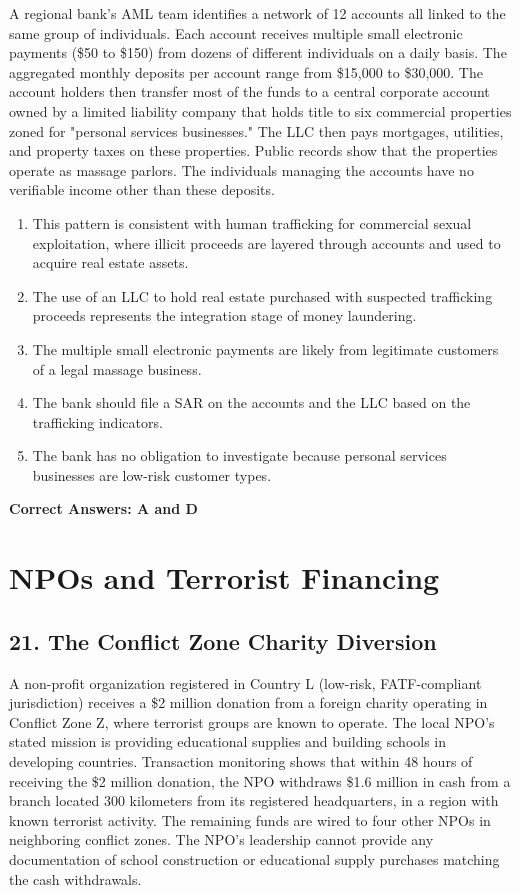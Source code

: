 \documentclass[11pt,a4paper]{article}
\begin{document}
	A regional bank's AML team identifies a network of 12 accounts all linked to the same group of individuals. Each account receives multiple small electronic payments (\$50 to \$150) from dozens of different individuals on a daily basis. The aggregated monthly deposits per account range from \$15,000 to \$30,000. The account holders then transfer most of the funds to a central corporate account owned by a limited liability company that holds title to six commercial properties zoned for "personal services businesses." The LLC then pays mortgages, utilities, and property taxes on these properties. Public records show that the properties operate as massage parlors. The individuals managing the accounts have no verifiable income other than these deposits.
	
	\begin{enumerate}[label=\Alph*.]
		\item This pattern is consistent with human trafficking for commercial sexual exploitation, where illicit proceeds are layered through accounts and used to acquire real estate assets.
		\item The use of an LLC to hold real estate purchased with suspected trafficking proceeds represents the integration stage of money laundering.
		\item The multiple small electronic payments are likely from legitimate customers of a legal massage business.
		\item The bank should file a SAR on the accounts and the LLC based on the trafficking indicators.
		\item The bank has no obligation to investigate because personal services businesses are low-risk customer types.
	\end{enumerate}
	
	\textbf{Correct Answers: A and D}
	
	\section{NPOs and Terrorist Financing}
	
	\subsection{21. The Conflict Zone Charity Diversion}
	
	A non-profit organization registered in Country L (low-risk, FATF-compliant jurisdiction) receives a \$2 million donation from a foreign charity operating in Conflict Zone Z, where terrorist groups are known to operate. The local NPO's stated mission is providing educational supplies and building schools in developing countries. Transaction monitoring shows that within 48 hours of receiving the \$2 million donation, the NPO withdraws \$1.6 million in cash from a branch located 300 kilometers from its registered headquarters, in a region with known terrorist activity. The remaining funds are wired to four other NPOs in neighboring conflict zones. The NPO's leadership cannot provide any documentation of school construction or educational supply purchases matching the cash withdrawals.
	
\end{document}
